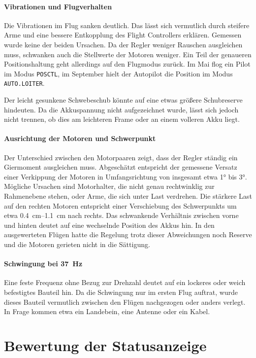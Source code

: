     \paragraph{Vibrationen und Flugverhalten}
    Die Vibrationen im Flug sanken deutlich. Das lässt sich vermutlich durch steifere Arme und eine bessere Entkopplung des Flight Controllers erklären. Gemessen wurde keine der beiden Ursachen. Da der Regler weniger Rauschen ausgleichen muss, schwanken auch die Stellwerte der Motoren weniger. Ein Teil der genaueren Positionshaltung geht allerdings auf den Flugmodus zurück. Im Mai flog ein Pilot im Modus \texttt{POSCTL}, im September hielt der Autopilot die Position im Modus \texttt{AUTO.LOITER}.

    Der leicht gesunkene Schwebeschub könnte auf eine etwas größere Schubreserve hindeuten. Da die Akkuspannung nicht aufgezeichnet wurde, lässt sich jedoch nicht trennen, ob dies am leichteren Frame oder an einem volleren Akku liegt.

    \paragraph{Ausrichtung der Motoren und Schwerpunkt}
    Der Unterschied zwischen den Motorpaaren zeigt, dass der Regler ständig ein Giermoment ausgleichen muss. Abgeschätzt entspricht der gemessene Versatz einer Verkippung der Motoren in Umfangsrichtung von insgesamt etwa \ang{1} bis \ang{3}. Mögliche Ursachen sind Motorhalter, die nicht genau rechtwinklig zur Rahmenebene stehen, oder Arme, die sich unter Last verdrehen. Die stärkere Last auf den rechten Motoren entspricht einer Verschiebung des Schwerpunkts um etwa \SIrange{0,4}{1,1}{\centi\metre} nach rechts. Das schwankende Verhältnis zwischen vorne und hinten deutet auf eine wechselnde Position des Akkus hin. In den ausgewerteten Flügen hatte die Regelung trotz dieser Abweichungen noch Reserve und die Motoren gerieten nicht in die Sättigung.

    \paragraph{Schwingung bei \SI{37}{\hertz}}
    Eine feste Frequenz ohne Bezug zur Drehzahl deutet auf ein lockeres oder weich befestigtes Bauteil hin. Da die Schwingung nur im ersten Flug auftrat, wurde dieses Bauteil vermutlich zwischen den Flügen nachgezogen oder anders verlegt. In Frage kommen etwa ein Landebein, eine Antenne oder ein Kabel.

    \section{Bewertung der Statusanzeige}
    \label{sec:Diskussion_LED}

